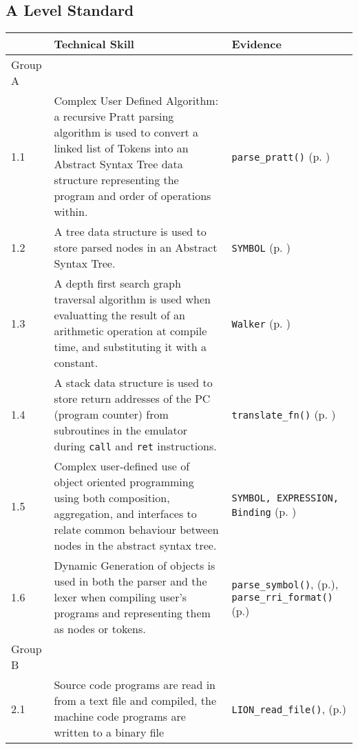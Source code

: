 \subsection{A Level Standard}

\begin{longtable}{ | p{2cm} | p{10cm} | p{3cm} | } 
    \hline
     & Technical Skill & Evidence\\
    \hline 
    Group A & & \\
    \hline
    1.1 & Complex User Defined Algorithm: a recursive Pratt parsing algorithm is used to convert a linked list of Tokens into an Abstract Syntax Tree data structure representing the program and order of operations within. & \texttt{parse\_pratt()} (p. \pageref{PrattParser}) \\
    \hline
    1.2 & A tree data structure is used to store parsed nodes in an Abstract Syntax Tree. & \texttt{SYMBOL} (p. \pageref{AST}) \\
    \hline
    1.3 & A depth first search graph traversal algorithm is used when evaluatting the result of an arithmetic operation at compile time, and substituting it with a constant. & \texttt{Walker} (p. \pageref{Walker})\\
    \hline
    1.4 & A stack data structure is used to store return addresses of the PC (program counter) from subroutines in the emulator during \texttt{call} and \texttt{ret} instructions. & \texttt{translate\_fn()} (p. \pageref{translate_fn}) \\
    \hline
    1.5 & Complex user-defined use of object oriented programming using both composition, aggregation, and interfaces to relate common behaviour between nodes in the abstract syntax tree. & \texttt{SYMBOL, EXPRESSION, Binding} (p. \pageref{AST})\\
    \hline
    1.6 & Dynamic Generation of objects is used in both the parser and the lexer when compiling user's programs and representing them as nodes or tokens. & \texttt{parse\_symbol()}, (p.\pageref{CompilerParseSymbol}), \texttt{parse\_rri\_format()} (p.\pageref{AssemblerParseRRIFormat})\\
    \hline
    Group B & & \\
    \hline
    2.1 & Source code programs are read in from a text file and compiled, the machine code programs are written to a binary file & \texttt{LION\_read\_file()}, (p.\pageref{LIONReadFile})\\
    \hline
\end{longtable}
